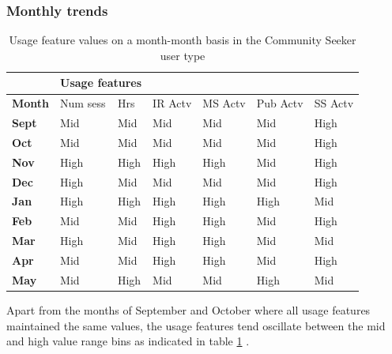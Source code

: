 \documentclass{acm_proc_article-sp}
\begin{document}
\subsubsection{Monthly trends}
\begin{table}
\caption{Usage feature values on a month-month basis in the Community Seeker user type}
\label{cluster2month}
\begin{tabular}{|p{1.5cm}|p{0.6cm}|p{0.6cm}|p{0.6cm}|p{0.6cm}|p{0.8cm}|p{0.8cm}|}
& \multicolumn{2}{r}{\textbf{Usage features}}  \\ \hline
 \textbf{Month} 
 & Num sess & Hrs & IR Actv & MS Actv & Pub Actv & SS Actv \\ \hline
\textbf{Sept} & Mid                                    & Mid   & Mid         & Mid             & Mid            & High              \\  \hline 
\textbf{Oct}   & Mid                                    & Mid   & Mid         & Mid             & Mid            & High               \\  \hline 
\textbf{Nov}  & High                                   & High  & High        & High            & Mid            & High              \\  \hline 
\textbf{Dec}  & High                                   & Mid   & Mid         & Mid             & Mid            & High            \\  \hline 
\textbf{Jan}   & High                                   & High  & High        & High            & High           & Mid                 \\  \hline 
\textbf{Feb}  & Mid                                    & Mid   & High        & High            & Mid            & High                 \\  \hline 
\textbf{Mar}     & High                                   & Mid   & High        & High            & Mid            & Mid                 \\  \hline 
\textbf{Apr}     & Mid                                    & Mid   & High        & High            & Mid            & High                \\  \hline 
\textbf{May}       & Mid                                    & High  & Mid         & Mid             & High           & Mid           \\  \hline       
\end{tabular}
\end{table}
Apart from the months of September and October where all usage features maintained the same values, the usage features tend oscillate between the mid and high value range bins as indicated in table \ref{cluster2month} .
\end{document}
